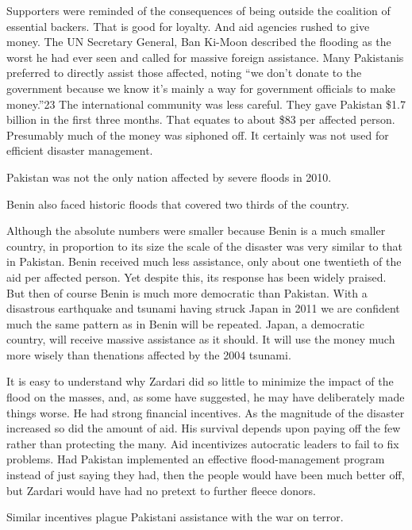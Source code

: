 \documentclass[10pt]{article}
\begin{document}
{\large Supporters were reminded of the consequences of being outside the
coalition of essential backers. That is good for loyalty. And aid agencies rushed
to give money. The UN Secretary General, Ban Ki-Moon described the flooding as
the worst he had ever seen and called for massive foreign assistance. Many
Pakistanis preferred to directly assist those affected, noting ``we don't donate
to the government because we know it's mainly a way for government officials to
make money.''23 The international community was less careful. They gave Pakistan
\$1.7 billion in the first three months. That equates to about \$83 per affected
person. Presumably much of the money was siphoned off. It certainly was not used
for efficient disaster management.}

{\large Pakistan was not the only nation affected by severe floods in 2010.}

{\large Benin also faced historic floods that covered two thirds of the
country.}

{\large Although the absolute numbers were smaller because Benin is a much
smaller country, in proportion to its size the scale of the disaster was very
similar to that in Pakistan. Benin received much less assistance, only about one
twentieth of the aid per affected person. Yet despite this, its response has been
widely praised. But then of course Benin is much more democratic than Pakistan.
With a disastrous earthquake and tsunami having struck Japan in 2011 we are
confident much the same pattern as in Benin will be repeated. Japan, a democratic
country, will receive massive assistance as it should. It will use the money much
more wisely than thenations affected by the 2004 tsunami.}

{\large It is easy to understand why Zardari did so little to minimize the
impact of the flood on the masses, and, as some have suggested, he may have
deliberately made things worse. He had strong financial incentives. As the
magnitude of the disaster increased so did the amount of aid. His survival
depends upon paying off the few rather than protecting the many. Aid incentivizes
autocratic leaders to fail to fix problems. Had Pakistan implemented an effective
flood-management program instead of just saying they had, then the people would
have been much better off, but Zardari would have had no pretext to further
fleece donors.}

{\large Similar incentives plague Pakistani assistance with the war on terror.}
\end{document}
